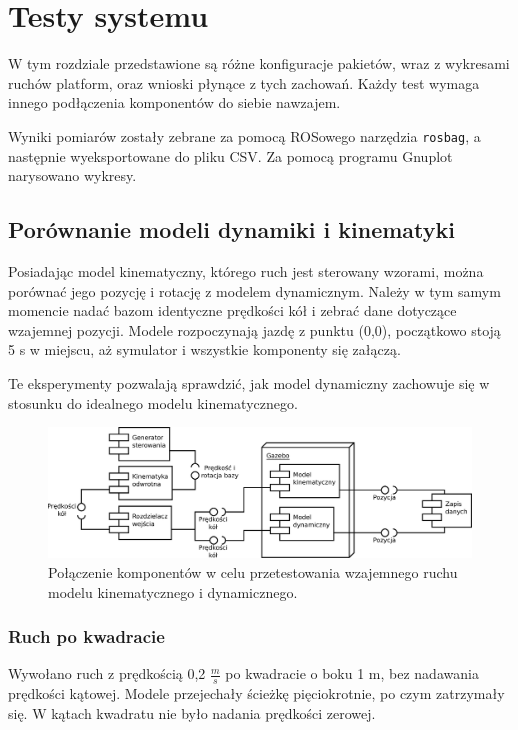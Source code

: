 \chapter{Testy systemu}
W tym rozdziale przedstawione są różne konfiguracje pakietów, wraz z wykresami ruchów platform, oraz wnioski płynące z tych zachowań.
Każdy test wymaga innego podłączenia komponentów do siebie nawzajem.

Wyniki pomiarów zostały zebrane za pomocą ROSowego narzędzia \texttt{rosbag}, a następnie wyeksportowane do pliku CSV. Za pomocą programu Gnuplot narysowano wykresy.

\section{Porównanie modeli dynamiki i kinematyki}
	Posiadając model kinematyczny, którego ruch jest sterowany wzorami, można porównać jego pozycję i rotację z modelem dynamicznym.
	Należy w tym samym momencie nadać bazom identyczne prędkości kół i zebrać dane dotyczące wzajemnej pozycji.
	Modele rozpoczynają jazdę z punktu (0,0), początkowo stoją 5 s w miejscu, aż symulator i wszystkie komponenty się załączą.
	
	Te eksperymenty pozwalają sprawdzić, jak model dynamiczny zachowuje się w stosunku do idealnego modelu kinematycznego.
	
	\begin{figure}[H]
		\centering
		\includegraphics[width=\textwidth]{uml/gramofon.pdf}
			\caption{Połączenie komponentów w celu przetestowania wzajemnego ruchu modelu kinematycznego i dynamicznego.}
		\label{uml:gramofon}
	\end{figure}
	
	\subsection{Ruch po kwadracie}
		Wywołano ruch z prędkością 0,2 $\frac{m}{s}$ po kwadracie o boku 1 m, bez nadawania prędkości kątowej.
		Modele przejechały ścieżkę pięciokrotnie, po czym zatrzymały się. W kątach kwadratu nie było nadania prędkości zerowej.
		
